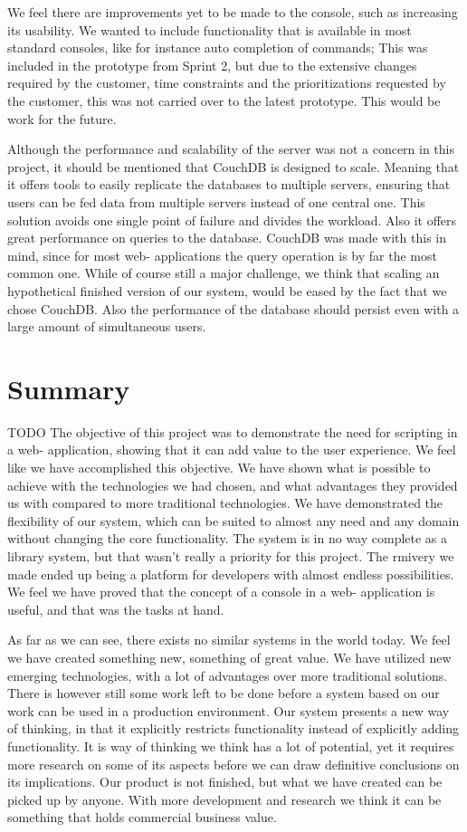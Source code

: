 We feel there are improvements yet to be made to the console, such as increasing its usability. We wanted to include functionality that is available in most standard consoles, like for instance auto completion of commands; This was included in the prototype from Sprint 2, but due to the extensive changes required by the customer, time constraints and the prioritizations requested by the customer, this was not carried over to the latest prototype. This would be work for the future.

Although the performance and scalability of the server was not a concern in this project, it should be mentioned that CouchDB is designed to scale. Meaning that it offers tools to easily replicate the databases to multiple servers, ensuring that users can be fed data from multiple servers instead of one central one. This solution avoids one single point of failure and divides the workload. Also it offers great performance on queries to the database. CouchDB was made with this in mind, since for most web- applications the query operation is by far the most common one. While of course still a major challenge, we think that scaling an hypothetical finished version of our system, would be eased by the fact that we chose CouchDB. Also the performance of the database should persist even with a large amount of simultaneous users.


\section{Summary}
TODO
The objective of this project was to demonstrate the need for scripting in a web- application, showing that it can add value to the user experience. We feel like we have accomplished this objective. We have shown what is possible to achieve with the technologies we had chosen, and what advantages they provided us with compared to more traditional technologies. We have demonstrated the flexibility of our system, which can be suited to almost any need and any domain without changing the core functionality. The system is in no way complete as a library system, but that wasn’t really a priority for this project. The rmivery we made ended up being a platform for developers with almost endless possibilities. We feel we have proved that the concept of a console in a web- application is useful, and that was the tasks at hand.

As far as we can see, there exists no similar systems in the world today. We feel we have created something new, something of great value. We have utilized new emerging technologies, with a lot of advantages over more traditional solutions. There is however still some work left to be done before a system based on our work can be used in a production environment. Our system presents a new way of thinking, in that it explicitly restricts functionality instead of explicitly adding functionality. It is way of thinking we think has a lot of potential, yet it requires more research on some of its aspects before we can draw definitive conclusions on its implications. Our product is not finished, but what we have created can be picked up by anyone. With more development and research we think it can be something that holds commercial business value.


